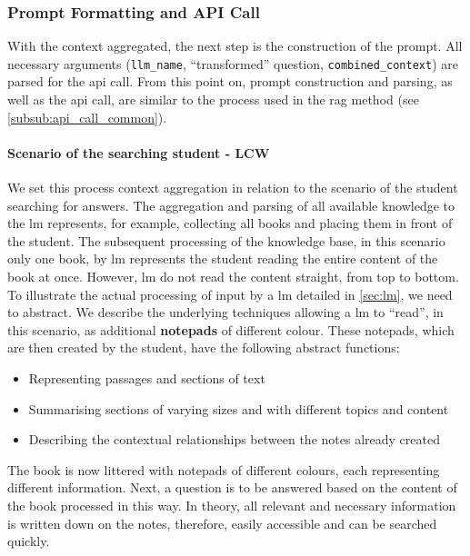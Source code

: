 \subsubsection{Prompt Formatting and API Call}\label{subsub:prompt_api_lcw}
%
With the context aggregated, the next step is the construction of the prompt.
%
All necessary arguments (\texttt{llm\_name}, \enquote{transformed} question, \texttt{combined\_context}) are parsed for the \ac{api} call.
From this point on, prompt construction and parsing, as well as the \ac{api} call, are similar to the process used in the \ac{rag} method (see \cref{subsub:api_call_common}).
%
\paragraph{Scenario of the searching student - LCW}
We set this process context aggregation in relation to the scenario of the student searching for answers.
The aggregation and parsing of all available knowledge to the \ac{lm} represents, for example, collecting all books and placing them in front of the student.
The subsequent processing of the knowledge base, in this scenario only one book, by \ac{lm} represents the student reading the entire content of the book at once.
However, \ac{lm} do not read the content straight, from top to bottom.
To illustrate the actual processing of input by a \ac{lm} detailed in \cref{sec:lm}, we need to abstract.
We describe the underlying techniques allowing a \ac{lm} to \enquote{read}, in this scenario, as additional \textbf{notepads} of different colour.
These notepads, which are then created by the student, have the following abstract functions:
\begin{itemize}
    \item Representing passages and sections of text
    \item Summarising sections of varying sizes and with different topics and content
    \item Describing the contextual relationships between the notes already created
\end{itemize}
%
The book is now littered with notepads of different colours, each representing different information.
Next, a question is to be answered based on the content of the book processed in this way.
In theory, all relevant and necessary information is written down on the notes, therefore, easily accessible and can be searched quickly.
%
